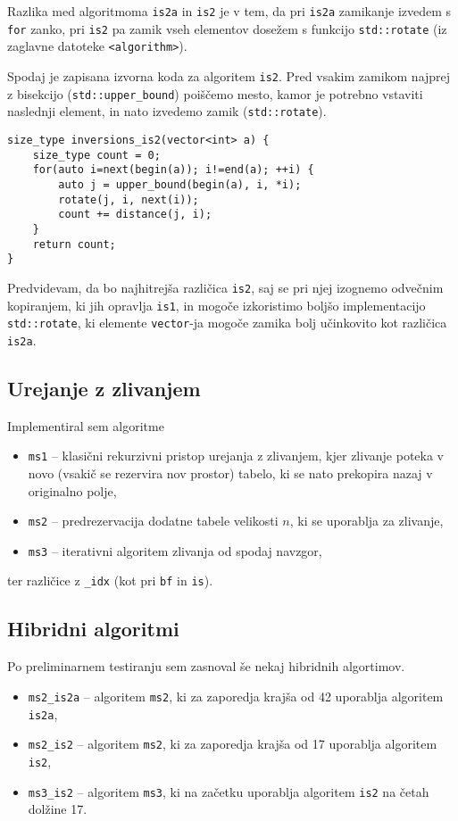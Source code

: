 \documentclass[11pt,a4paper]{article}
\theoremstyle{plain}
\theoremstyle{definition}
\begin{document}
Razlika med algoritmoma \lstinline!is2a! in \lstinline!is2! je v tem, da pri \lstinline!is2a! zamikanje izvedem s \lstinline!for! zanko, pri \lstinline!is2! pa zamik vseh elementov dosežem s funkcijo \lstinline!std::rotate! (iz zaglavne datoteke \lstinline!<algorithm>!).

Spodaj je zapisana izvorna koda za algoritem \lstinline!is2!. Pred vsakim zamikom najprej z bisekcijo (\lstinline!std::upper_bound!) poiščemo mesto, kamor je potrebno vstaviti naslednji element, in nato izvedemo zamik (\lstinline!std::rotate!).
\begin{lstlisting}
size_type inversions_is2(vector<int> a) {
    size_type count = 0;
    for(auto i=next(begin(a)); i!=end(a); ++i) {
        auto j = upper_bound(begin(a), i, *i);
        rotate(j, i, next(i));
        count += distance(j, i);
    }
    return count;
}
\end{lstlisting}

Predvidevam, da bo najhitrejša različica \lstinline!is2!, saj se pri njej izognemo odvečnim kopiranjem, ki jih opravlja \lstinline!is1!, in mogoče izkoristimo boljšo implementacijo \lstinline!std::rotate!, ki elemente \lstinline!vector!-ja mogoče zamika bolj učinkovito kot različica \lstinline!is2a!.

\subsection{Urejanje z zlivanjem}

Implementiral sem algoritme
\begin{itemize}
\item
\lstinline!ms1! -- klasični rekurzivni pristop urejanja z zlivanjem, kjer zlivanje poteka v novo (vsakič se rezervira nov prostor) tabelo, ki se nato prekopira nazaj v originalno polje,
\item
\lstinline!ms2! -- predrezervacija dodatne tabele velikosti $n$, ki se uporablja za zlivanje,
\item
\lstinline!ms3! -- iterativni algoritem zlivanja od spodaj navzgor,
\end{itemize}
ter različice z \lstinline!_idx! (kot pri \lstinline!bf! in \lstinline!is!).

\subsection{Hibridni algoritmi}

Po preliminarnem testiranju sem zasnoval še nekaj hibridnih algortimov.
\begin{itemize}
\item
\lstinline!ms2_is2a! -- algoritem \lstinline!ms2!, ki za zaporedja krajša od 42 uporablja algoritem \lstinline!is2a!,
\item
\lstinline!ms2_is2! -- algoritem \lstinline!ms2!, ki za zaporedja krajša od 17 uporablja algoritem \lstinline!is2!,
\item
\lstinline!ms3_is2! -- algoritem \lstinline!ms3!, ki na začetku uporablja algoritem \lstinline!is2! na četah dolžine 17.
\end{itemize}
\end{document}

